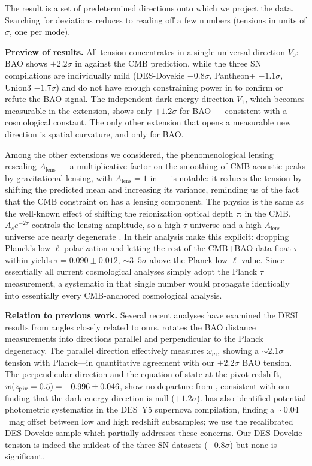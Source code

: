 The result is a set of predetermined directions onto which we project the data. Searching for deviations reduces to reading off a few numbers (tensions in units of $\sigma$, one per mode).

\textbf{Preview of results.} All tension concentrates in a single universal direction $V_0$: BAO shows $+2.2\sigma$ in \czero against the CMB prediction, while the three SN compilations are individually mild (DES-Dovekie $-0.8\sigma$, Pantheon+ $-1.1\sigma$, Union3 $-1.7\sigma$) and do not have enough constraining power in \czero to confirm or refute the BAO signal. The independent dark-energy direction $V_1$, which becomes measurable in the \wowa extension, shows only $+1.2\sigma$ for BAO --- consistent with a cosmological constant. The only other extension that opens a measurable new direction is spatial curvature, and only for BAO.

Among the other extensions we considered, the phenomenological lensing rescaling $A_\mathrm{lens}$ --- a multiplicative factor on the smoothing of CMB acoustic peaks by gravitational lensing, with $A_\mathrm{lens} = 1$ in \LCDM \citep{Calabrese2008} --- is notable: it reduces the tension by shifting the predicted \czero mean and increasing its variance, reminding us of the fact that the CMB constraint on \omh has a lensing component. The physics is the same as the well-known effect of shifting the reionization optical depth $\tau$: in the CMB, $A_s e^{-2\tau}$ controls the lensing amplitude, so a high-$\tau$ universe and a high-$A_\mathrm{lens}$ universe are nearly degenerate \citep{Sailer2026}. In their analysis \citet{Sailer2026} make this explicit: dropping Planck's low-$\ell$ polarization and letting the rest of the CMB$+$BAO data float $\tau$ within \LCDM yields $\tau = 0.090 \pm 0.012$, $\sim 3$--$5\sigma$ above the Planck low-$\ell$ value. Since essentially all current cosmological analyses simply adopt the Planck $\tau$ measurement, a systematic in that single number would propagate identically into essentially every CMB-anchored cosmological analysis.

\textbf{Relation to previous work.} Several recent analyses have examined the DESI results from angles closely related to ours. \citet{Efstathiou2025_BAO} rotates the BAO distance measurements into directions parallel and perpendicular to the Planck \LCDM degeneracy. The parallel direction effectively measures $\omega_m$, showing a ${\sim}2.1\sigma$ tension with Planck---in quantitative agreement with our $+2.2\sigma$ BAO \czero tension. The perpendicular direction and the equation of state at the pivot redshift, $w(z_{\rm piv} = 0.5) = -0.996 \pm 0.046$, show no departure from \LCDM, consistent with our finding that the dark energy direction \cone is null ($+1.2\sigma$). \citet{Efstathiou2025_SN} has also identified potential photometric systematics in the DES~Y5 supernova compilation, finding a ${\sim}0.04$~mag offset between low and high redshift subsamples; we use the recalibrated DES-Dovekie sample \citep{Popovic2025} which partially addresses these concerns. Our DES-Dovekie \czero tension is indeed the mildest of the three SN datasets ($-0.8\sigma$) but none is significant. 

